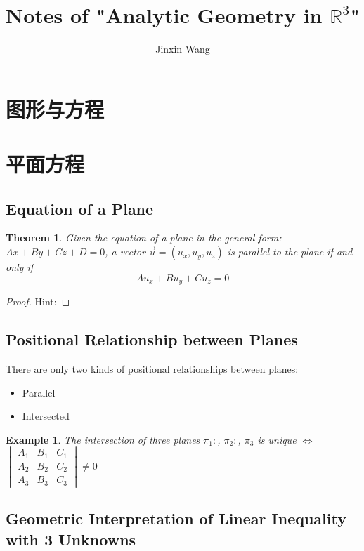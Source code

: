 \documentclass[onecolumn]{ctexart}
\title{Notes of "Analytic Geometry in $\mathbb{R}^3$"}
\author{Jinxin Wang}
\date{}
\newtheorem{theorem}{Theorem}
\newtheorem{example}{Example}
\begin{document}
\maketitle

\section{图形与方程}

\section{平面方程}

\subsection{Equation of a Plane}

\begin{theorem}
  Given the equation of a plane in the general form: $Ax + By + Cz + D = 0$, a 
  vector $\vec{u} = (u_x, u_y, u_z)$ is parallel to the plane if and only if
  \begin{equation}
    Au_x + Bu_y + Cu_z = 0
  \end{equation}
\end{theorem}
\begin{proof}
  Hint:
\end{proof}

\subsection{Positional Relationship between Planes}
There are only two kinds of positional relationships between planes:
\begin{itemize}
  \item Parallel
  \item Intersected
\end{itemize}

\begin{example}
  The intersection of three planes $\pi_1: $, $\pi_2: $, $\pi_3$ is unique $\Leftrightarrow$
  $\begin{vmatrix}
    A_1 & B_1 & C_1 \\
    A_2 & B_2 & C_2 \\
    A_3 & B_3 & C_3
  \end{vmatrix} \neq 0$
\end{example}

\subsection{Geometric Interpretation of Linear Inequality with 3 Unknowns}
\end{document}
